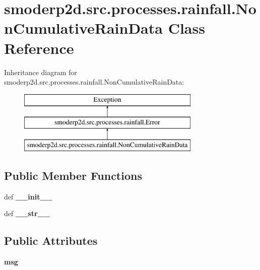 \hypertarget{classsmoderp2d_1_1src_1_1processes_1_1rainfall_1_1NonCumulativeRainData}{\section{smoderp2d.\-src.\-processes.\-rainfall.\-Non\-Cumulative\-Rain\-Data Class Reference}
\label{classsmoderp2d_1_1src_1_1processes_1_1rainfall_1_1NonCumulativeRainData}
}
Inheritance diagram for smoderp2d.\-src.\-processes.\-rainfall.\-Non\-Cumulative\-Rain\-Data\-:\begin{figure}[H]
\begin{center}
\leavevmode
\includegraphics[height=3.000000cm]{classsmoderp2d_1_1src_1_1processes_1_1rainfall_1_1NonCumulativeRainData}
\end{center}
\end{figure}
\subsection*{Public Member Functions}
\begin{DoxyCompactItemize}
\item 
\hypertarget{classsmoderp2d_1_1src_1_1processes_1_1rainfall_1_1NonCumulativeRainData_a8c1819953f50758356fecb2e21298949}{def {\bfseries \-\_\-\-\_\-init\-\_\-\-\_\-}}\label{classsmoderp2d_1_1src_1_1processes_1_1rainfall_1_1NonCumulativeRainData_a8c1819953f50758356fecb2e21298949}

\item 
\hypertarget{classsmoderp2d_1_1src_1_1processes_1_1rainfall_1_1NonCumulativeRainData_ae724b18ea56d343746cdcec410a591fe}{def {\bfseries \-\_\-\-\_\-str\-\_\-\-\_\-}}\label{classsmoderp2d_1_1src_1_1processes_1_1rainfall_1_1NonCumulativeRainData_ae724b18ea56d343746cdcec410a591fe}

\end{DoxyCompactItemize}
\subsection*{Public Attributes}
\begin{DoxyCompactItemize}
\item 
\hypertarget{classsmoderp2d_1_1src_1_1processes_1_1rainfall_1_1NonCumulativeRainData_a238df79989636c9e0df402640d1d2a57}{{\bfseries msg}}\label{classsmoderp2d_1_1src_1_1processes_1_1rainfall_1_1NonCumulativeRainData_a238df79989636c9e0df402640d1d2a57}

\end{DoxyCompactItemize}


